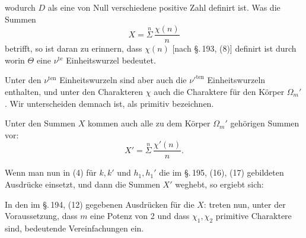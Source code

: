 
wodurch $D$ als eine von Null verschiedene positive Zahl definirt ist.
Was die Summen
\[
X = \overset{n}{\Sigma}\, \frac{\chi(n)}{n}
\]
betrifft, so ist daran zu erinnern, dass $\chi(n)$ [nach \S.\,193, (8)]
definirt ist durch
worin $\Theta$ eine $\nu^{\mathrm{te}}$ Einheitswurzel bedeutet.

Unter den $\nu^{\mathrm{ten}}$ Einheitswurzeln sind aber auch die
$\nu'^{\mathrm{ten}}$ Einheitswurzeln enthalten, und unter den
Charakteren $\chi$ auch die Charaktere f\"ur den K\"orper $\Omega_m'$.
Wir unterscheiden demnach  ist, als primitiv
bezeichnen.

Unter den Summen $X$ kommen auch alle zu dem K\"orper $\Omega_m'$
geh\"origen Summen vor:
\[
X' = \overset{n}{\Sigma}\, \frac{\chi'(n)}{n}.
\]

Wenn man nun in (4) f\"ur $k, k'$ und $h_1, h_1'$ die im \S.\,195, (16),
(17) gebildeten Ausdr\"ucke einsetzt, und dann die Summen $X'$
weghebt, so ergiebt sich:

In den im \S.\,194, (12) gegebenen Ausdr\"ucken f\"ur die $X$:
treten nun, unter der Voraussetzung, dass $m$ eine Potenz von 2 und
dass $\chi_1, \chi_2$ primitive Charaktere sind, bedeutende
Vereinfachungen ein.
